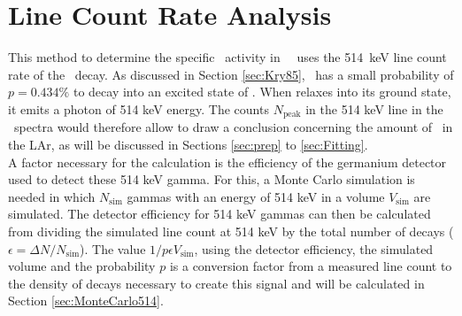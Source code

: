 \documentclass[encoding=utf8,british]{tumphthesis}
\begin{document}

 
 
 
 
 
 
 
 
 
 
 
 
 
 
 
 
 
 
 
 
 
 
 
 
 
 
 
 
 
 
 
 
 
 
 
 
 
 
 
 
 
 
 
\chapter{Line Count Rate Analysis}
\label{sec:SAfrom514}

This method to determine the specific \Kr\ activity in \gerda\ \PII\ uses the 514~keV line count rate of the \Kr\ decay.
As discussed in Section \ref{sec:Kry85}, \Kr\ has a small probability of $p=0.434\%$ to decay into an excited state of . 
When  relaxes into its ground state, it emits a photon of 514 keV energy.
The counts $N_{\mathrm{peak}}$ in the 514 keV line in the \gerda\ spectra would therefore allow to draw a conclusion concerning the amount of \Kr\ in the LAr, as will be discussed in Sections \ref{sec:prep} to \ref{sec:Fitting}. 
\\

A factor necessary for the calculation is the efficiency of the germanium detector used to detect these 514 keV gamma.
For this, a Monte Carlo simulation is needed in which $N_{\mathrm{sim}}$ gammas with an energy of 514 keV  in a  volume $V_{\mathrm{sim}}$ are simulated.
The detector efficiency for 514 keV gammas can then be calculated from dividing the simulated line count at 514 keV by the total number of  decays ($\epsilon = \Delta N/N_{\mathrm{sim}}$).
The value $1/p \epsilon V_{\mathrm{sim}}$, using the detector efficiency, the simulated volume and the probability $p$ is a conversion factor from a measured line count to the density of decays necessary to create this signal and will be calculated in Section \ref{sec:MonteCarlo514}.
\\
\end{document}
